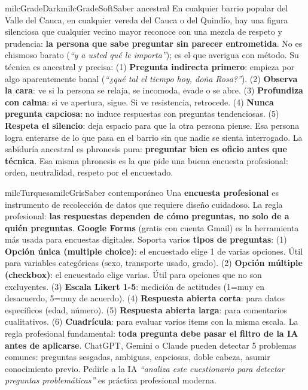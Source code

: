 \documentclass[11pt,letterpaper]{article}
\begin{document}
\begin{softbox}{milcGradeDark}{milcGradeSoft}{Saber ancestral}
En cualquier barrio popular del Valle del Cauca, en cualquier vereda del Cauca o del Quindío, hay una figura silenciosa que cualquier vecino mayor reconoce con una mezcla de respeto y prudencia: \textbf{la persona que sabe preguntar sin parecer entrometida}. No es chismoso barato (\emph{``y a usted qué le importa''}); es el que averigua con método. Su técnica es ancestral y precisa: (1) \textbf{Pregunta indirecta primero}: empieza por algo aparentemente banal (\emph{``¿qué tal el tiempo hoy, doña Rosa?''}). (2) \textbf{Observa la cara}: ve si la persona se relaja, se incomoda, evade o se abre. (3) \textbf{Profundiza con calma}: si ve apertura, sigue. Si ve resistencia, retrocede. (4) \textbf{Nunca pregunta capciosa}: no induce respuestas con preguntas tendenciosas. (5) \textbf{Respeta el silencio}: deja espacio para que la otra persona piense. Esa persona logra enterarse de lo que pasa en el barrio sin que nadie se sienta interrogado. La sabiduría ancestral es phronesis pura: \textbf{preguntar bien es oficio antes que técnica}. Esa misma phronesis es la que pide una buena encuesta profesional: orden, neutralidad, respeto por el encuestado.
\end{softbox}

\begin{softbox}{milcTurquesa}{milcGris}{Saber contemporáneo}
Una \textbf{encuesta profesional} es instrumento de recolección de datos que requiere diseño cuidadoso. La regla profesional: \textbf{las respuestas dependen de cómo preguntas, no solo de a quién preguntas}. \textbf{Google Forms} (gratis con cuenta Gmail) es la herramienta más usada para encuestas digitales. Soporta varios \textbf{tipos de preguntas}: (1) \textbf{Opción única (multiple choice)}: el encuestado elige 1 de varias opciones. Útil para variables categóricas (sexo, transporte usado, grado). (2) \textbf{Opción múltiple (checkbox)}: el encuestado elige varias. Útil para opciones que no son excluyentes. (3) \textbf{Escala Likert 1-5}: medición de actitudes (1=muy en desacuerdo, 5=muy de acuerdo). (4) \textbf{Respuesta abierta corta}: para datos específicos (edad, número). (5) \textbf{Respuesta abierta larga}: para comentarios cualitativos. (6) \textbf{Cuadrícula}: para evaluar varios items con la misma escala. La regla profesional fundamental: \textbf{toda pregunta debe pasar el filtro de la IA antes de aplicarse}. ChatGPT, Gemini o Claude pueden detectar 5 problemas comunes: preguntas sesgadas, ambiguas, capciosas, doble cabeza, asumir conocimiento previo. Pedirle a la IA \emph{``analiza este cuestionario para detectar preguntas problemáticas''} es práctica profesional moderna.
\end{softbox}
\end{document}
